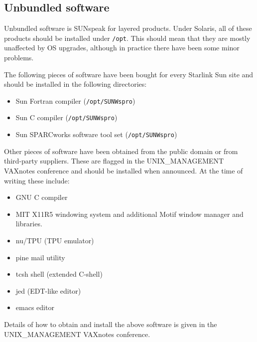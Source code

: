 \subsection{Unbundled software}

Unbundled software is SUNspeak for layered products.	
Under Solaris, all of these products should be installed under \verb+/opt+.
This should mean that they are mostly unaffected by OS upgrades,
although in practice there have been some minor problems. 

The following pieces of software have been bought for every Starlink
Sun site and should be installed in the following directories:

\begin{itemize}

\item	Sun Fortran compiler ({\tt /opt/SUNWspro})
\item	Sun C compiler ({\tt /opt/SUNWspro})
\item   Sun SPARCworks software tool set ({\tt /opt/SUNWspro})

\end{itemize}

Other pieces of software have been obtained from the public domain
or from third-party suppliers. These are flagged in the
UNIX\_MANAGEMENT VAXnotes conference and should be installed when announced.
At the time of writing these include:

\begin{itemize}

\item GNU C compiler

\item MIT X11R5 windowing system and additional Motif window manager and
libraries.

\item nu/TPU (TPU emulator)

\item pine mail utility

\item tcsh shell (extended C-shell)

\item jed (EDT-like editor)

\item emacs editor

\end{itemize}

Details of how to obtain and install the above software is given in
the UNIX\_MANAGEMENT VAXnotes conference.

